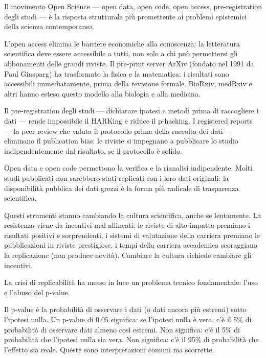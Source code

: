 \documentclass[12pt,a4paper,openany]{book}
\newcommand{\sezione}[1]{\vspace{1.2em}{\large\bfseries #1}\vspace{0.5em}\par}
\begin{document}
\sezione{La scienza aperta e la democrazia della conoscenza}

Il movimento Open Science --- open data, open code, open access, pre-registration degli studi --- è la risposta strutturale più promettente ai problemi epistemici della scienza contemporanea.

L'open access elimina le barriere economiche alla conoscenza: la letteratura scientifica deve essere accessibile a tutti, non solo a chi può permettersi gli abbonamenti delle grandi riviste. Il pre-print server ArXiv (fondato nel 1991 da Paul Ginsparg) ha trasformato la fisica e la matematica: i risultati sono accessibili immediatamente, prima della revisione formale. BioRxiv, medRxiv e altri hanno esteso questo modello alla biologia e alla medicina.

Il pre-registration degli studi --- dichiarare ipotesi e metodi prima di raccogliere i dati --- rende impossibile il HARKing e riduce il p-hacking. I registered reports --- la peer review che valuta il protocollo prima della raccolta dei dati --- eliminano il publication bias: le riviste si impegnano a pubblicare lo studio indipendentemente dal risultato, se il protocollo è solido.

Open data e open code permettono la verifica e la rianalisi indipendente. Molti studi pubblicati non sarebbero stati replicati con i loro dati originali: la disponibilità pubblica dei dati grezzi è la forma più radicale di trasparenza scientifica.

Questi strumenti stanno cambiando la cultura scientifica, anche se lentamente. La resistenza viene da incentivi mal allineati: le riviste di alto impatto premiano i risultati positivi e sorprendenti, i sistemi di valutazione della carriera premiano le pubblicazioni in riviste prestigiose, i tempi della carriera accademica scoraggiano la replicazione (non produce novità). Cambiare la cultura richiede cambiare gli incentivi.

\sezione{Il ruolo della statistica: p-value, effetto dimensione, e bayesianismo}

La crisi di replicabilità ha messo in luce un problema tecnico fondamentale: l'uso e l'abuso del p-value.

Il p-value è la probabilità di osservare i dati (o dati ancora più estremi) sotto l'ipotesi nulla. Un p-value di 0.05 significa: se l'ipotesi nulla è vera, c'è il 5\% di probabilità di osservare dati almeno così estremi. Non significa: c'è il 5\% di probabilità che l'ipotesi nulla sia vera. Non significa: c'è il 95\% di probabilità che l'effetto sia reale. Queste sono interpretazioni comuni ma scorrette.
\end{document}
